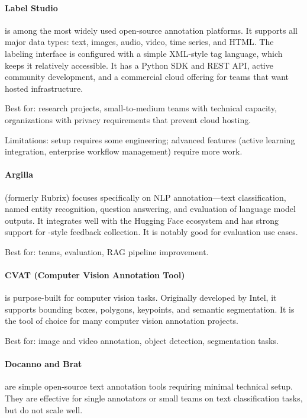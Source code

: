 \paragraph{Label Studio} is among the most widely used open-source annotation platforms. It supports all major data types: text, images, audio, video, time series, and HTML. The labeling interface is configured with a simple XML-style tag language, which keeps it relatively accessible. It has a Python SDK and REST API, active community development, and a commercial cloud offering for teams that want hosted infrastructure.

Best for: research projects, small-to-medium teams with technical capacity, organizations with privacy requirements that prevent cloud hosting.

Limitations: setup requires some engineering; advanced features (active learning integration, enterprise workflow management) require more work.

\paragraph{Argilla} (formerly Rubrix) focuses specifically on NLP annotation---text classification, named entity recognition, question answering, and evaluation of language model outputs. It integrates well with the Hugging Face ecosystem and has strong support for \rlhf-style feedback collection. It is notably good for \llm evaluation use cases.

Best for: \nlp teams, \llm evaluation, RAG pipeline improvement.

\paragraph{CVAT (Computer Vision Annotation Tool)} is purpose-built for computer vision tasks. Originally developed by Intel, it supports bounding boxes, polygons, keypoints, and semantic segmentation. It is the tool of choice for many computer vision annotation projects.

Best for: image and video annotation, object detection, segmentation tasks.

\paragraph{Docanno and Brat} are simple open-source text annotation tools requiring minimal technical setup. They are effective for single annotators or small teams on text classification tasks, but do not scale well.

